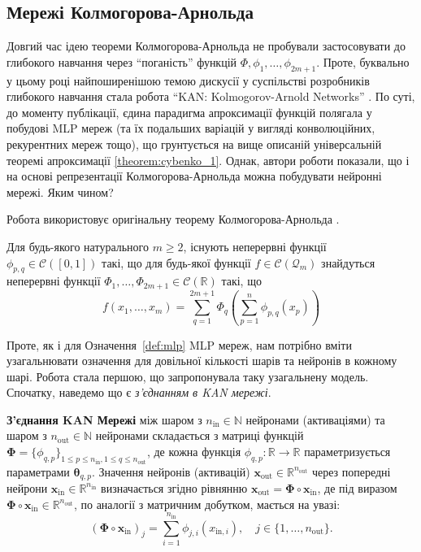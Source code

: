 \subsection{Мережі Колмогорова-Арнольда}

Довгий час ідею теореми Колмогорова-Арнольда не пробували застосовувати до
глибокого навчання через ``поганість'' функцій $\Phi,\phi_1,\dots,\phi_{2m+1}$.
Проте, буквально у цьому році найпоширенішою темою дискусії у суспільстві
розробників глибокого навчання стала робота ``KAN: Kolmogorov-Arnold Networks''
\cite{kan}. По суті, до моменту публікації, єдина парадигма апроксимації функцій
полягала у побудові MLP мереж (та їх подальших варіацій у вигляді конволюційних,
рекурентних мереж тощо), що грунтується на вище описаній універсальній теоремі
апроксимації \ref{theorem:cybenko_1}. Однак, автори роботи \cite{kan} показали,
що і на основі репрезентації Колмогорова-Арнольда можна побудувати нейронні мережі. 
Яким чином?

Робота \cite{kan} використовує оригінальну теорему Колмогорова-Арнольда \cite{kolmogorov-original}.
\begin{definition}
	Для будь-якого натурального $m \geq 2$, існують неперервні функції
	$\phi_{p,q} \in \mathcal{C}([0,1])$ такі, що для будь-якої функції $f \in
	\mathcal{C}(\mathcal{Q}_m)$ знайдуться неперервні функції
	$\Phi_1,\dots,\Phi_{2m+1} \in \mathcal{C}(\mathbb{R})$ такі, що
	\begin{equation*}
		f(x_1,\dots,x_m) = \sum_{q=1}^{2m+1}\Phi_q\left(\sum_{p=1}^n \phi_{p,q}(x_p)\right)
	\end{equation*}
\end{definition}

Проте, як і для Означення~\ref{def:mlp} MLP мереж, нам потрібно вміти узагальнювати
означення для довільної кількості шарів та нейронів в кожному шарі. Робота 
\cite{kan} стала першою, що запропонувала таку узагальнену модель. Спочатку,
наведемо що є \textit{з'єднанням в KAN мережі}.

\begin{definition}
	\textbf{З'єднання KAN Мережі} між шаром з $n_{\text{in}} \in \mathbb{N}$
	нейронами (активаціями) та шаром з $n_{\text{out}} \in \mathbb{N}$ нейронами
	складається з матриці функцій $\boldsymbol{\Phi} = \{\phi_{q,p}\}_{1\leq
	p\leq n_{\text{in}}, 1 \leq q \leq n_{\text{out}}}$, де кожна функція
	$\phi_{q,p}: \mathbb{R} \to \mathbb{R}$ параметризується параметрами
	$\boldsymbol{\theta}_{q,p}$. Значення нейронів (активацій)
	$\mathbf{x}_{\text{out}} \in \mathbb{R}^{n_{\text{out}}}$ через попередні
	нейрони $\mathbf{x}_{\text{in}} \in \mathbb{R}^{n_{\text{in}}}$ визначається
	згідно рівнянню $\mathbf{x}_{\text{out}} = \boldsymbol{\Phi} \circ
	\mathbf{x}_{\text{in}}$, де під виразом $\boldsymbol{\Phi} \circ
	\mathbf{x}_{\text{in}} \in \mathbb{R}^{n_{\text{out}}}$, по аналогії з
	матричним добутком, мається на увазі:
	\begin{equation*}
		(\boldsymbol{\Phi} \circ \mathbf{x}_{\text{in}})_j = \sum_{i=1}^{n_{\text{in}}}\phi_{j,i}(x_{\text{in},i}), \quad j \in \{1,\dots,n_{\text{out}}\}.
	\end{equation*}
\end{definition}

